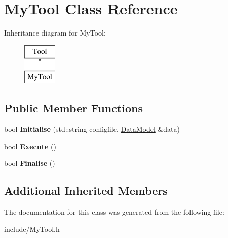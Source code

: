 \hypertarget{classMyTool}{\section{My\-Tool Class Reference}
\label{classMyTool}
}
Inheritance diagram for My\-Tool\-:\begin{figure}[H]
\begin{center}
\leavevmode
\includegraphics[height=2.000000cm]{classMyTool}
\end{center}
\end{figure}
\subsection*{Public Member Functions}
\begin{DoxyCompactItemize}
\item 
\hypertarget{classMyTool_a3bf60061195a18542c4cfb2916b9dad9}{bool {\bfseries Initialise} (std\-::string configfile, \hyperlink{classDataModel}{Data\-Model} \&data)}\label{classMyTool_a3bf60061195a18542c4cfb2916b9dad9}

\item 
\hypertarget{classMyTool_a0a58122023af90b9200d0e71e89cfb36}{bool {\bfseries Execute} ()}\label{classMyTool_a0a58122023af90b9200d0e71e89cfb36}

\item 
\hypertarget{classMyTool_a060ec6356451aa335d0de41093c9992f}{bool {\bfseries Finalise} ()}\label{classMyTool_a060ec6356451aa335d0de41093c9992f}

\end{DoxyCompactItemize}
\subsection*{Additional Inherited Members}


The documentation for this class was generated from the following file\-:\begin{DoxyCompactItemize}
\item 
include/My\-Tool.\-h\end{DoxyCompactItemize}
